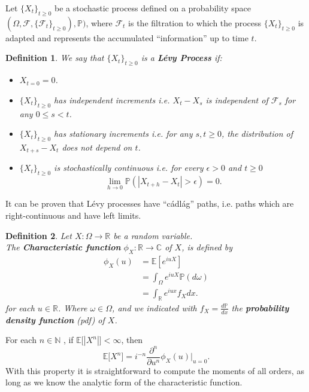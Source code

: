 \documentclass[a4paper,10pt]{article}
\newcommand{\numberset}{\mathbb}
\newcommand{\N}{\numberset{N}}
\newcommand{\R}{\numberset{R}}
\newcommand{\E}{\numberset{E}}
\newcommand{\C}{\numberset{C}}
\newcommand{\PP}{\numberset{P}}
\newtheorem{Definition}{Definition}[section]
\begin{document}
Let $\{X_t\}_{t \ge 0}$ be a stochastic process defined on a probability space $(\Omega,\mathcal{F},\{\mathcal{F}_t\}_{t \ge 0}),\PP)$, 
where $\mathcal{F}_t$ is the filtration to which the process $\{X_t\}_{t \ge 0}$ is adapted and represents the accumulated ``information'' up to time $t$.\\ 
\begin{Definition}\label{LevyDef}
We say that $\{X_t\}_{t \ge 0}$ is a \textbf{Lévy Process} if:
\begin{itemize}
 \item[(\textbf{L1})] $X_{t=0} = 0$.
 \item[(\textbf{L2})] $\{X_t\}_{t \ge 0}$ has independent increments i.e. $X_t - X_s$ is independent of $\mathcal{F}_s$ for any $0 \leq s < t$.
 \item[(\textbf{L3})] $\{X_t\}_{t \ge 0}$ has stationary increments i.e. for any $s,t \geq 0$, the distribution of $X_{t+s} - X_t$ does not depend on $t$.
 \item[(\textbf{L4})] $\{X_t\}_{t \ge 0}$ is stochastically continuous i.e. for every $\epsilon > 0 $ and $t \ge 0$  $$\lim_{h\to 0} \PP(|X_{t+h}-X_t| > \epsilon)=0. $$ 
\end{itemize}
\end{Definition}
It can be proven that Lévy processes have ``cádlág''
paths, i.e. paths which are right-continuous and have left limits. 


\begin{Definition} \label{chf}
Let $X: \Omega \to \R$ be a random variable.\\ 
The \textbf{Characteristic function} $\phi_X:\R \to \C$  of $X$, is defined by
\begin{align}
\phi_{X}(u) &= \E [e^{iuX}] \nonumber \\
            &= \int_{\Omega} e^{iuX} \PP(d\omega) \nonumber \\
            &= \int_{\R} e^{iux} f_X dx.
\end{align}
for each $u \in \R$. Where $\omega \in \Omega$, and we indicated with $f_X = \frac{d\PP}{dx}$ the \textbf{probability density function} (pdf) of $X$.
\end{Definition}
For each $n \in \N$ , if $\E\bigl[ |X^{n}| \bigr] < \infty$, then 
\begin{equation}\label{moments}
 \E\bigl[ X^{n} \bigr] = i^{-n}\frac{\partial^n}{\partial u^{n}} \phi_X(u) \biggr|_{u=0} .
\end{equation}
With this property it is straightforward to compute the moments of all orders, as long as we know the analytic form 
of the characteristic function.
\end{document}
